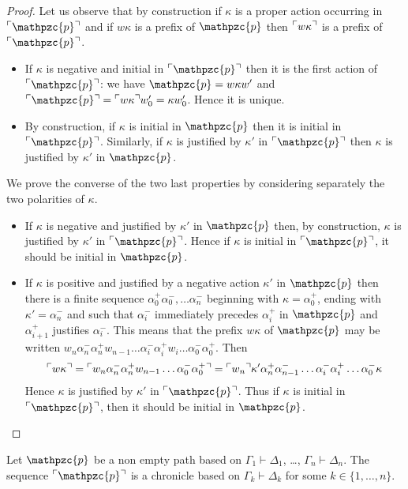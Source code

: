 \documentclass{LMCS}
\newcommand{\design}[1]{{\mathfrak{#1}}}
\newcommand{\pathLL}[1]{\mathpzc{#1}}\newcommand{\strategy}[1]{\pathLL{#1}}\newcommand{\view}[1]{\raisebox{.3ex}{$\ulcorner$}{#1}\raisebox{.3ex}{$\urcorner$}}\newcommand{\fullview}[1]{\raisebox{.3ex}{$\ulcorner\mkern-6mu\ulcorner\mkern-2mu$}{#1}\raisebox{.3ex}{$\mkern-2mu\urcorner\mkern-6mu\urcorner$}}\newcommand{\views}[1]{\view{#1}}\newcommand{\fullviews}[1]{\fullview{#1}}\newcommand{\shuffle}[1]{\llcorner\design{#1}\lrcorner}\newcommand{\PoD}[1]{{\mathcal{P}}_{#1}}\newcommand{\norm}[1]{\llbracket\design{#1}\rrbracket}
\begin{document}
\begin{proof}
Let us observe that by construction if $\kappa$ is a proper action occurring in $\view{\pathLL{p}}$ and if $w\kappa$ is a prefix of $\pathLL{p}$ then $\view{w\kappa}$ is a prefix of $\view{\pathLL{p}}$.
\begin{itemize}
\item If  $\kappa$ is negative and initial in $\view{\pathLL{p}}$ then it is the first action of $\view{\pathLL{p}}$: we have $\pathLL{p} = w\kappa w'$ and $\view{\pathLL{p}} = \view{w\kappa}w'_0 = \kappa w'_0$. Hence it is unique.
\item By construction, if $\kappa$ is initial in $\pathLL{p}$ then it is initial in $\view{\pathLL{p}}$. 
Similarly, if $\kappa$ is justified by $\kappa'$ in $\view{\pathLL{p}}$ then  $\kappa$ is justified by $\kappa'$ in $\pathLL{p}$.
\end{itemize}
We prove the converse of the two last properties by considering separately the two polarities of $\kappa$.
\begin{itemize}
\item If $\kappa$ is negative and justified  by $\kappa'$ in $\pathLL{p}$ then, by construction, $\kappa$ is justified by $\kappa'$ in $\view{\pathLL{p}}$. Hence if $\kappa$ is initial in $\view{\pathLL{p}}$, it should be initial in $\pathLL{p}$.
\item If $\kappa$ is positive and justified by a negative action $\kappa'$ in $\pathLL{p}$ then there is a finite sequence 
 $\alpha_0^+\alpha^-_0,\dots\alpha^-_n$  beginning with $\kappa=\alpha_0^+$, ending with $\kappa'=\alpha_n^-$ and such that $\alpha^-_i$ immediately precedes $\alpha^+_i$ in $\pathLL{p}$ and $\alpha_{i+1}^+$ justifies $\alpha_i^-$. This means that the prefix $w\kappa$ of $\pathLL{p}$  may be written 
 $w_n\alpha^-_n\alpha^+_nw_{n-1}\dots\alpha^-_i\alpha^+_iw_i\dots\alpha_0^-\alpha^+_0$. Then 
\[
\view{w\kappa}=\view{w_n\alpha^-_n\alpha^+_nw_{n-1}\dots \alpha_0^-\alpha^+_0}
=\view{w_n}\kappa'\alpha^+_n\alpha^-_{n-1}\dots\alpha^-_i\alpha^+_i\dots\alpha_0^-\kappa
 \]
 Hence $\kappa$ is justified by $\kappa'$ in $\view{\pathLL{p}}$.
 Thus if $\kappa$ is initial in $\view{\pathLL{p}}$, then it should be initial in $\pathLL{p}$.
\end{itemize}
  \end{proof}


\begin{prop}\label{chroniclebase}
Let $\pathLL{p}$ be a non empty path based on $\Gamma_1\vdash\Delta_1$, \dots,  $\Gamma_n\vdash\Delta_n$. The sequence $\view{\pathLL{p}}$   is a chronicle based on $\Gamma_k\vdash\Delta_k$ for some $k\in\{1,\dots,n\}$.
\end{prop}
\end{document}
